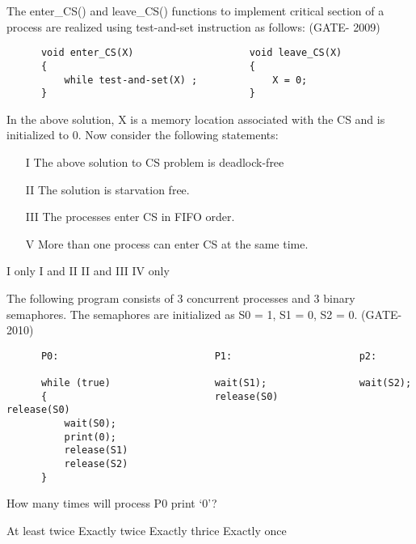 \begin{questyle}

  \question  The enter\_CS() and leave\_CS() functions to implement critical section of a process are realized using test-and-set instruction as follows: (GATE- 2009)

  \begin{lstlisting}
      void enter_CS(X)                    void leave_CS(X)
      {                                   {
          while test-and-set(X) ;             X = 0;
      }                                   }
  \end{lstlisting}
  In the above solution, X is a memory location associated with the CS and is initialized to 0. Now consider the following statements:
  \begin{enumerate}
      \item[I]  The above solution to CS problem is deadlock-free
      \item[II] The solution is starvation free.
      \item[III] The processes enter CS in FIFO order.
      \item[V]   More than one process can enter CS at the same time.
   \end{enumerate}

  \begin{choices}
    \choice  I only
    \choice  I and II
    \choice  II and III
    \choice   IV only
  \end{choices}

  \end{questyle}




\begin{questyle}

  \question  The following program consists of 3 concurrent processes and 3 binary semaphores.
             The semaphores are initialized as S0 = 1, S1 = 0, S2 = 0. (GATE- 2010)

  \begin{lstlisting}
      P0:                           P1:                      p2:

      while (true)                  wait(S1);                wait(S2);
      {                             release(S0)              release(S0)
          wait(S0);
          print(0);
          release(S1)
          release(S2)
      }
  \end{lstlisting}
  How many times will process P0 print ‘0’?

  \begin{choices}
    \choice  At least twice
    \choice  Exactly twice
    \choice  Exactly thrice
    \choice  Exactly once
  \end{choices}

  \end{questyle}



